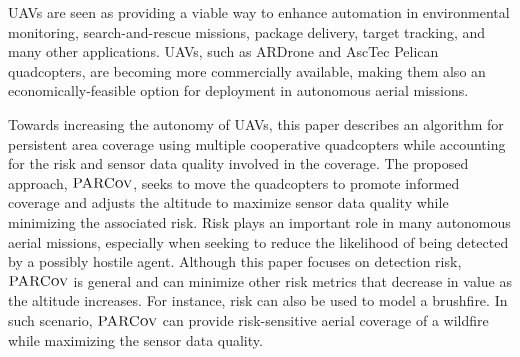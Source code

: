 \documentclass[letterpaper, 10pt, conference]{ieeeconf}
\newcommand{\Function}[1]{\ensuremath{{ \textsc{#1}}}}
\newcommand{\Name}{\Function{\small{PARCov}}}
\begin{document}


UAVs are seen as providing a viable way to enhance automation in
environmental monitoring, search-and-rescue missions, package
delivery, target tracking, and many other applications.  UAVs, such as
ARDrone and AscTec Pelican quadcopters, are becoming more commercially
available, making them also an economically-feasible option for
deployment in autonomous aerial missions.

Towards increasing the autonomy of UAVs, this paper describes an
algorithm for persistent area coverage using multiple cooperative
quadcopters while accounting for the risk and sensor data quality
involved in the coverage. The proposed approach, $\Name$, seeks to
move the quadcopters to promote informed coverage and adjusts the
altitude to maximize sensor data quality while minimizing the
associated risk. Risk plays an important role in many autonomous
aerial missions, especially when seeking to reduce the likelihood of
being detected by a possibly hostile agent. Although this paper
focuses on detection risk, $\Name$ is general and can minimize other
risk metrics that decrease in value as the altitude increases.  For
instance, risk can also be used to model a brushfire. In such
scenario, $\Name$ can provide risk-sensitive aerial
coverage of a wildfire while maximizing the sensor data quality.





\end{document}
